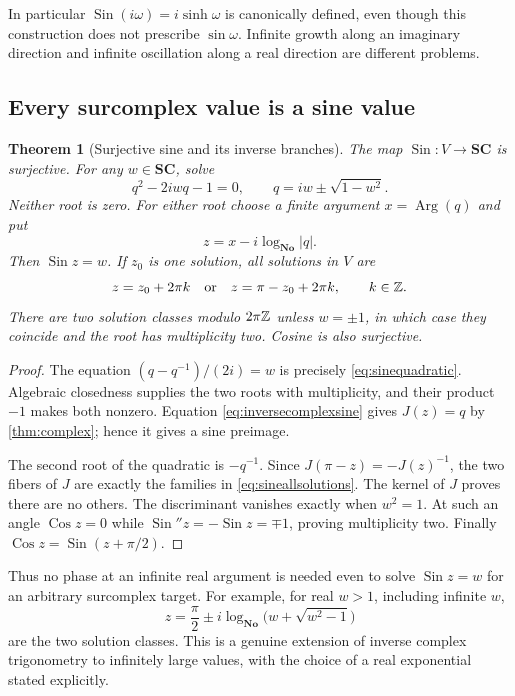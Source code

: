 \documentclass[11pt,letterpaper]{article}
\newtheorem{theorem}{Theorem}[section]
\theoremstyle{definition}
\theoremstyle{remark}
\newcommand{\No}{\mathbf{No}}
\newcommand{\SC}{\mathbf{SC}}
\newcommand{\Arg}{\operatorname{Arg}}
\newcommand{\Sin}{\operatorname{Sin}}\newcommand{\Cos}{\operatorname{Cos}}
\numberwithin{equation}{section}
\begin{document}
In particular $\Sin(i\omega)=i\sinh\omega$ is canonically defined, even though this construction does not prescribe $\sin\omega$. Infinite growth along an imaginary direction and infinite oscillation along a real direction are different problems.

\subsection{Every surcomplex value is a sine value}
\begin{theorem}[Surjective sine and its inverse branches]\label{thm:surjectivesine}
The map $\Sin:V\to\SC$ is surjective. For any $w\in\SC$, solve
\begin{equation}\label{eq:sinequadratic}
 q^2-2iwq-1=0,
 \qquad q=iw\pm\sqrt{1-w^2}.
\end{equation}
Neither root is zero. For either root choose a finite argument $x=\Arg(q)$ and put
\begin{equation}\label{eq:inversecomplexsine}
 z=x-i\log_\No|q|.
\end{equation}
Then $\Sin z=w$. If $z_0$ is one solution, all solutions in $V$ are
\begin{equation}\label{eq:sineallsolutions}
 z=z_0+2\pi k\quad\text{or}\quad z=\pi-z_0+2\pi k,
 \qquad k\in\mathbb Z.
\end{equation}
There are two solution classes modulo $2\pi\mathbb Z$ unless $w=\pm1$, in which case they coincide and the root has multiplicity two. Cosine is also surjective.
\end{theorem}
\begin{proof}
The equation $(q-q^{-1})/(2i)=w$ is precisely \eqref{eq:sinequadratic}. Algebraic closedness supplies the two roots with multiplicity, and their product $-1$ makes both nonzero. Equation \eqref{eq:inversecomplexsine} gives $J(z)=q$ by \cref{thm:complex}; hence it gives a sine preimage.

The second root of the quadratic is $-q^{-1}$. Since $J(\pi-z)=-J(z)^{-1}$, the two fibers of $J$ are exactly the families in \eqref{eq:sineallsolutions}. The kernel of $J$ proves there are no others. The discriminant vanishes exactly when $w^2=1$. At such an angle $\Cos z=0$ while $\Sin''z=-\Sin z=\mp1$, proving multiplicity two. Finally $\Cos z=\Sin(z+\pi/2)$.
\end{proof}
Thus no phase at an infinite real argument is needed even to solve $\Sin z=w$ for an arbitrary surcomplex target. For example, for real $w>1$, including infinite $w$,
\[
 z=\frac\pi2\pm i\log_\No\bigl(w+\sqrt{w^2-1}\bigr)
\]
are the two solution classes. This is a genuine extension of inverse complex trigonometry to infinitely large values, with the choice of a real exponential stated explicitly.
\end{document}
